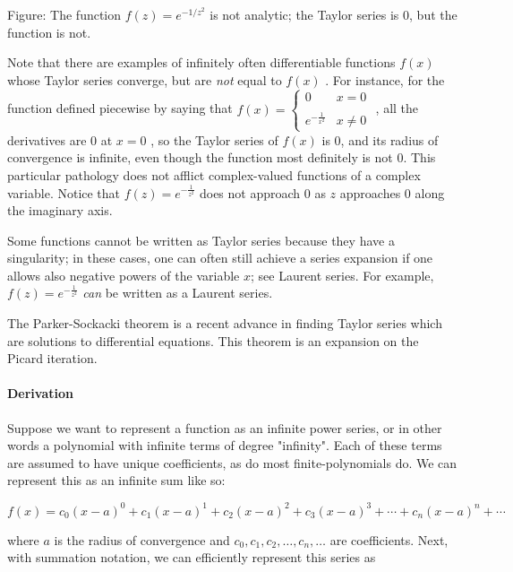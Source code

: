 Figure: The function $f(z) = e^{-1/z^2}$ is not analytic; the Taylor series is 0, but the function is not.



Note that there are examples of infinitely often differentiable functions $f(x)$ whose Taylor series converge, but are \textit{not} equal to $f(x)$ . For instance, for the function defined piecewise by saying that $f(x)=\begin{cases}0 & x=0 \\\\ e^{-\frac{1}{x^2}} & x\ne 0 \end{cases}$ , all the derivatives are 0 at $x=0$ , so the Taylor series of $f(x)$ is 0, and its radius of convergence is infinite, even though the function most definitely is not 0. This particular pathology does not afflict complex-valued functions of a complex variable. Notice that $f(z)=e^{-\frac{1}{z^2}}$ does not approach 0 as $z$ approaches 0 along the imaginary axis.



Some functions cannot be written as Taylor series because they have a singularity; in these cases, one can often still achieve a series expansion if one allows also negative powers of the variable $x$; see Laurent series. For example, $f(z)=e^{-\frac{1}{z^2}}$ \textit{can} be written as a Laurent series.



The Parker-Sockacki theorem is a recent advance in finding Taylor series which are solutions to differential equations. This theorem is an expansion on the Picard iteration.



\paragraph{Derivation}



Suppose we want to represent a function as an infinite power series, or in other words a polynomial with infinite terms of degree "infinity". Each of these terms are assumed to have unique coefficients, as do most finite-polynomials do. We can represent this as an infinite sum like so:



$$f(x)={c _0}(x-a)^0+c _1(x-a)^1+c _2(x-a)^2+c _3(x-a)^3+\cdots+c _n(x-a)^n+\cdots$$

where $a$ is the radius of convergence and $c _0,c _1,c _2,\dots,c _n,\dots$ are coefficients. Next, with summation notation, we can efficiently represent this series as



